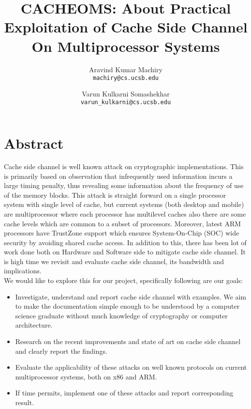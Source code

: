 \documentclass[11pt, pdftex]{article}
\title{CACHEOMS: About Practical Exploitation of \textbf{Cache} Side Channel \textbf{O}n \textbf{M}ultiprocessor \textbf{S}ystems}
\author{Aravind Kumar Machiry \\
\texttt{machiry@cs.ucsb.edu} \and Varun Kulkarni Somashekhar\\
\texttt{varun\_kulkarni@cs.ucsb.edu}}
\begin{document}
\maketitle
\section{Abstract}
Cache side channel is well known attack on cryptographic implementations\cite{bernstein2005cache}\cite{aciccmez2006trace}\cite{banescu2011cache}. This is primarily based on observation that infrequently used information incurs a large timing penalty, thus revealing some information about the frequency of use of the memory blocks. This attack is straight forward on a single processor system with single level of cache, but current systems (both desktop and mobile) are multiprocessor where each processor has multilevel caches also there are some cache levels which are common to a subset of processors. Moreover, latest ARM processors have TrustZone support\cite{frenzel2010arm} which ensures System-On-Chip (SOC) wide security by avoiding shared cache access. In addition to this, there has been lot of work done both on Hardware and Software side to mitigate cache side channel\cite{180212}\cite{wang2007new}. It is high time we revisit and evaluate cache side channel, its bandwidth and implications\cite{184415}.\\
We would like to explore this for our project, specifically following are our goals:
\begin{itemize}
\item Investigate, understand and report cache side channel with examples. We aim to make the documentation simple enough to be understood by a computer science graduate without much knowledge of cryptography or computer architecture.
\item Research on the recent improvements and state of art on cache side channel and clearly report the findings.
\item Evaluate the applicability of these attacks on well known protocols on current multiprocessor systems, both on x86 and ARM.
\item If time permits, implement one of these attacks and report corresponding result.
\end{itemize}


\end{document}
